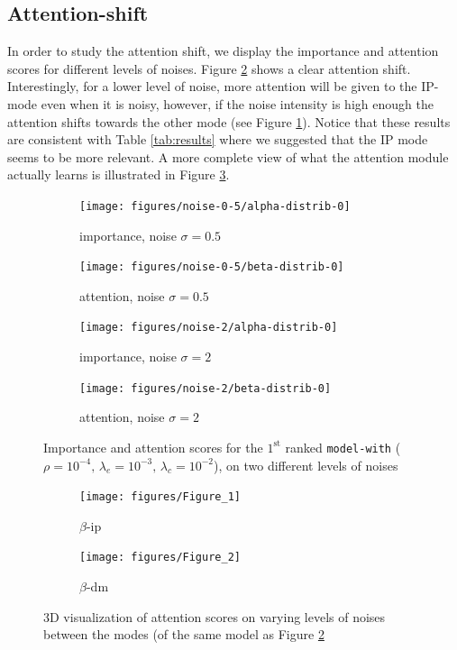 \subsection*{Attention-shift}
In order to study the attention shift, we display the importance and attention scores for different levels of noises. Figure \ref{fig:exp-att-shift-1} shows a clear attention shift. Interestingly, for a lower level of noise, more attention will be given to the IP-mode even when it is noisy, however, if the noise intensity is high enough the attention shifts towards the other mode (see Figure \ref{fig:exp-att-shift-1-d}). Notice that these results are consistent with Table \ref{tab:results} where we suggested that the IP mode seems to be more relevant. A more complete view of what the attention module actually learns is illustrated in Figure \ref{fig:mesh}.
\begin{figure}[!h]
\centering
\begin{subfigure}{.5\textwidth}
  \centering
  \texttt{[image: figures/noise-0-5/alpha-distrib-0]}
  \caption{importance, noise $\sigma=0.5$} 
\end{subfigure}%
\begin{subfigure}{.5\textwidth}
  \centering
  \texttt{[image: figures/noise-0-5/beta-distrib-0]}
  \caption{attention, noise $\sigma=0.5$} 
\end{subfigure}
\begin{subfigure}{.5\textwidth}
  \centering
  \texttt{[image: figures/noise-2/alpha-distrib-0]}
  \caption{importance, noise $\sigma=2$} 
\end{subfigure}%
\begin{subfigure}{.5\textwidth}
  \centering
  \texttt{[image: figures/noise-2/beta-distrib-0]}
  \caption{attention, noise $\sigma=2$} 
  \label{fig:exp-att-shift-1-d}
\end{subfigure}
\caption{Importance and attention scores for the $1^{\text{st}}$ ranked \texttt{model-with} ($\rho=10^{-4},\,\lambda_e=10^{-3},\,\lambda_c=10^{-2}$), on two different levels of noises}
\label{fig:exp-att-shift-1}
\end{figure}
\begin{figure}[!h]
\centering
\begin{subfigure}{.5\textwidth}
  \centering
  \texttt{[image: figures/Figure\_1]} 
  \caption{$\beta$-ip}
\end{subfigure}%
\begin{subfigure}{.5\textwidth}
  \centering
  \texttt{[image: figures/Figure\_2]} 
  \caption{$\beta$-dm}
\end{subfigure}
\caption{3D visualization of attention scores on varying levels of noises between the modes (of the same model as Figure \ref{fig:exp-att-shift-1}}
\label{fig:mesh}
\end{figure}


